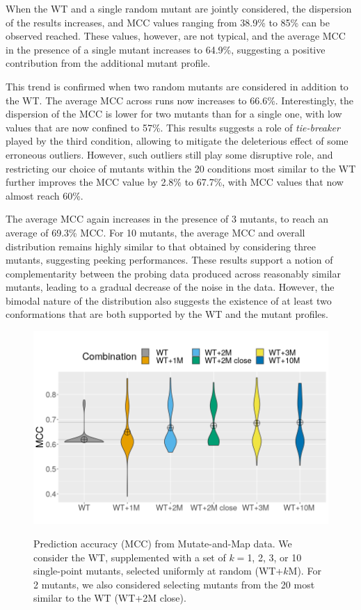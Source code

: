 \documentclass[a4,center,fleqn]{NAR}
\begin{document}
When the WT and a single random mutant are jointly considered, the dispersion of the results increases, and MCC values ranging from 38.9\% to 85\% can be observed reached.%
These values, however, are not typical, and the average MCC in the presence of a single mutant increases to 64.9\%,%
suggesting a positive contribution from the additional mutant profile. 

This trend is confirmed when two random mutants are considered in addition to the WT. The average MCC across runs now increases to 66.6\%. %
Interestingly, the dispersion of the MCC is lower for two mutants than for a single one, with low values that are now confined to 57\%.  This results suggests  a role of \emph{tie-breaker} played by the third condition, allowing to mitigate the deleterious effect of some erroneous outliers.
However, such outliers still play some disruptive role, and restricting our choice of mutants within the 20 conditions most similar to the WT further improves the MCC value by 2.8\% to 67.7\%, with MCC values that now almost reach 60\%.  

The average MCC again increases in the presence of 3 mutants, to reach an average of 69.3\% MCC. For 10 mutants, the average MCC and overall distribution remains highly similar to that obtained by considering three mutants, suggesting peeking performances. These results support a notion of complementarity between the probing data produced across reasonably similar mutants, leading to a gradual decrease of the noise in the data. However, the bimodal nature of the distribution also suggests the existence of at least two conformations that are both supported by the WT and the mutant profiles.

\begin{figure}
	{\centering
		\includegraphics[width=\linewidth]{graphs/combinationscale.png}\\}
		
	\caption{Prediction accuracy (MCC) from Mutate-and-Map data. We consider the WT, supplemented with a set of $k=$1, 2, 3, or 10 single-point mutants, selected uniformly at random ({\sf WT+$k$M}). For 2 mutants, we also considered selecting mutants from the 20 most similar to the WT ({\sf WT+2M close}).}\label{fig:variantanalysis}
\end{figure}
\end{document}
